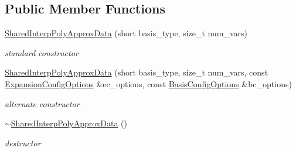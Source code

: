 \subsection*{Public Member Functions}
\begin{DoxyCompactItemize}
\item 
\hyperlink{classPecos_1_1SharedInterpPolyApproxData_ad6d25f2ccaeaff4d96f8bd1472e61c5d}{Shared\+Interp\+Poly\+Approx\+Data} (short basis\+\_\+type, size\+\_\+t num\+\_\+vars)\label{classPecos_1_1SharedInterpPolyApproxData_ad6d25f2ccaeaff4d96f8bd1472e61c5d}

\begin{DoxyCompactList}\small\item\em standard constructor \end{DoxyCompactList}\item 
\hyperlink{classPecos_1_1SharedInterpPolyApproxData_a9f60ce35fa8e788d4eee9cb8afc034bd}{Shared\+Interp\+Poly\+Approx\+Data} (short basis\+\_\+type, size\+\_\+t num\+\_\+vars, const \hyperlink{classPecos_1_1ExpansionConfigOptions}{Expansion\+Config\+Options} \&ec\+\_\+options, const \hyperlink{classPecos_1_1BasisConfigOptions}{Basis\+Config\+Options} \&bc\+\_\+options)\label{classPecos_1_1SharedInterpPolyApproxData_a9f60ce35fa8e788d4eee9cb8afc034bd}

\begin{DoxyCompactList}\small\item\em alternate constructor \end{DoxyCompactList}\item 
\hyperlink{classPecos_1_1SharedInterpPolyApproxData_a10190ade86d4389d77f21b9c20ed5cb8}{$\sim$\+Shared\+Interp\+Poly\+Approx\+Data} ()\label{classPecos_1_1SharedInterpPolyApproxData_a10190ade86d4389d77f21b9c20ed5cb8}

\begin{DoxyCompactList}\small\item\em destructor \end{DoxyCompactList}\end{DoxyCompactItemize}

